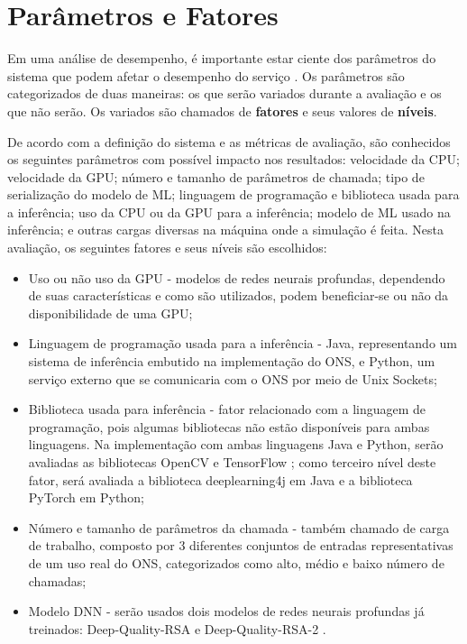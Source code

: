 \section{Parâmetros e Fatores}
\label{paramsfactors}

Em uma análise de desempenho, é importante estar ciente dos parâmetros do sistema que podem afetar o desempenho do serviço \cite{jain1991art}. Os parâmetros são categorizados de duas maneiras: os que serão variados durante a avaliação e os que não serão. Os variados são chamados de \textbf{fatores} e seus valores de \textbf{níveis}.

De acordo com a definição do sistema e as métricas de avaliação, são conhecidos os seguintes parâmetros com possível impacto nos resultados: velocidade da CPU; velocidade da GPU; número e tamanho de parâmetros de chamada; tipo de serialização do modelo de ML; linguagem de programação e biblioteca usada para a inferência; uso da CPU ou da GPU para a inferência; modelo de ML usado na inferência; e outras cargas diversas na máquina onde a simulação é feita. Nesta avaliação, os seguintes fatores e seus níveis são escolhidos:

\begin{itemize}
  \item Uso ou não uso da GPU - modelos de redes neurais profundas, dependendo de suas características e como são utilizados, podem beneficiar-se ou não da disponibilidade de uma GPU;
  \item Linguagem de programação usada para a inferência - Java, representando um sistema de inferência embutido na implementação do ONS, e Python, um serviço externo que se comunicaria com o ONS por meio de Unix Sockets; %
  \item Biblioteca usada para inferência - fator relacionado com a linguagem de programação, pois algumas bibliotecas não estão disponíveis para ambas linguagens. Na implementação com ambas linguagens Java e Python, serão avaliadas as bibliotecas OpenCV \cite{opencv} e TensorFlow \cite{tensorflow}; como terceiro nível deste fator, será avaliada a biblioteca deeplearning4j \cite{deeplearning4j} em Java e a biblioteca PyTorch \cite{pytorch} em Python;
  \item Número e tamanho de parâmetros da chamada - também chamado de carga de trabalho, composto por 3 diferentes conjuntos de entradas representativas de um uso real do ONS, categorizados como alto, médio e baixo número de chamadas;
  \item Modelo DNN - serão usados dois modelos de redes neurais profundas já treinados: Deep-Quality-RSA \cite{deep_quality_rsa} e Deep-Quality-RSA-2 \cite{deep_quality_rsa}.
\end{itemize}

